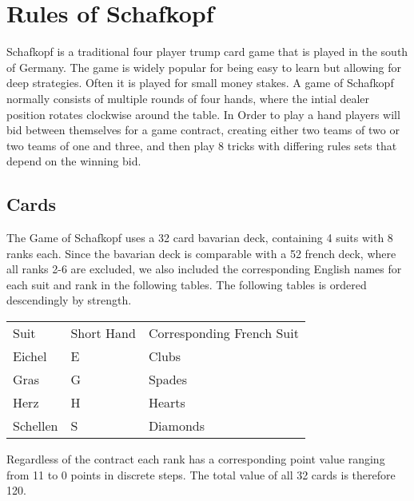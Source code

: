 \chapter{Rules of Schafkopf}
Schafkopf is a traditional four player trump card game that is played in the south of Germany.
The game is widely popular for being easy to learn but allowing for deep strategies.
Often it is played for small money stakes.
A game of Schafkopf normally consists of multiple rounds of four hands, where the intial dealer position rotates
clockwise around the table.
In Order to play a hand players will bid between themselves for a game contract, creating either two teams of two or
two teams of one and three, and then play 8 tricks with differing rules sets that depend on the winning bid.


\section{Cards}\label{sec:cards}
The Game of Schafkopf uses a 32 card bavarian deck, containing 4 suits with 8 ranks each.
Since the bavarian deck is comparable with a 52 french deck, where all ranks 2-6 are excluded, we also included the
corresponding English names for each suit and rank in the following tables.
The following tables is ordered descendingly by strength.
\begin{table}[]
    \begin{tabular}{lll}
        Suit     & Short Hand & Corresponding French Suit \\
        Eichel   & E          & Clubs                     \\
        Gras     & G          & Spades                    \\
        Herz     & H          & Hearts                    \\
        Schellen & S          & Diamonds
    \end{tabular}\label{tab:table2}
\end{table}
Regardless of the contract each rank has a corresponding point value ranging from 11 to 0 points in discrete steps.
The total value of all 32 cards is therefore 120.
